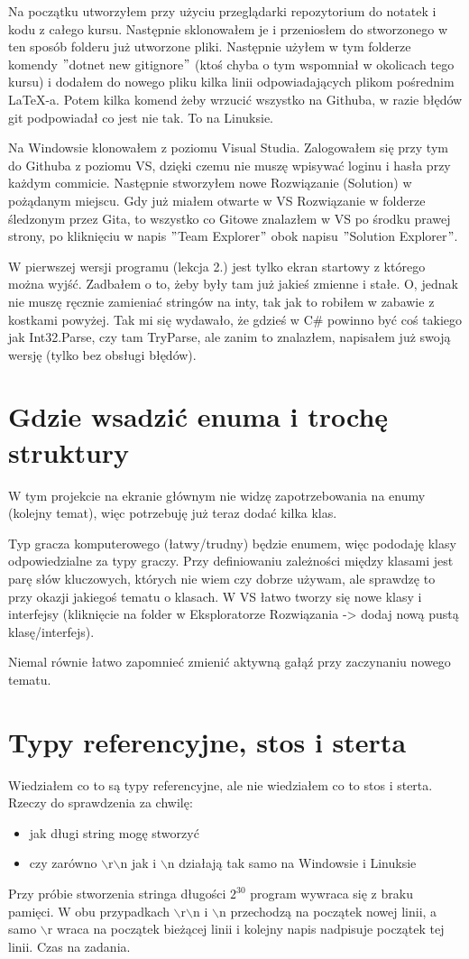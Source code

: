 \documentclass[10pt]{article}
\begin{document}
Na początku utworzyłem przy użyciu przeglądarki repozytorium do notatek i kodu z całego kursu. Następnie sklonowałem je i przeniosłem do stworzonego w ten sposób folderu już utworzone pliki. Następnie użyłem w tym folderze komendy $"$dotnet new gitignore$"$ (ktoś chyba o tym wspomniał w okolicach tego kursu) i dodałem do nowego pliku kilka linii odpowiadających plikom pośrednim LaTeX-a. Potem kilka komend żeby wrzucić wszystko na Githuba, w razie błędów git podpowiadał co jest nie tak. To na Linuksie.

Na Windowsie klonowałem z poziomu Visual Studia. Zalogowałem się przy tym do Githuba z poziomu VS, dzięki czemu nie muszę wpisywać loginu i hasła przy każdym commicie. Następnie stworzyłem nowe Rozwiązanie (Solution) w pożądanym miejscu. Gdy już miałem otwarte w VS Rozwiązanie w folderze śledzonym przez Gita, to wszystko co Gitowe znalazłem w VS po środku prawej strony, po kliknięciu w napis $"$Team Explorer$"$ obok napisu $"$Solution Explorer$"$.

W pierwszej wersji programu (lekcja 2.) jest tylko ekran startowy z którego można wyjść. Zadbałem o to, żeby były tam już jakieś zmienne i stałe. O, jednak nie muszę ręcznie zamieniać stringów na inty, tak jak to robiłem w zabawie z kostkami powyżej. Tak mi się wydawało, że gdzieś w C\# powinno być coś takiego jak Int32.Parse, czy tam TryParse, ale zanim to znalazłem, napisałem już swoją wersję (tylko bez obsługi błędów).

\section{Gdzie wsadzić enuma i trochę struktury}
W tym projekcie na ekranie głównym nie widzę zapotrzebowania na enumy (kolejny temat), więc potrzebuję już teraz dodać kilka klas.

Typ gracza komputerowego (łatwy/trudny) będzie enumem, więc pododaję klasy odpowiedzialne za typy graczy. Przy definiowaniu zależności między klasami jest parę słów kluczowych, których nie wiem czy dobrze używam, ale sprawdzę to przy okazji jakiegoś tematu o klasach. W VS łatwo tworzy się nowe klasy i interfejsy (kliknięcie na folder w Eksploratorze Rozwiązania -> dodaj nową pustą klasę/interfejs).

Niemal równie łatwo zapomnieć zmienić aktywną gałąź przy zaczynaniu nowego tematu.
\section{Typy referencyjne, stos i sterta}
Wiedziałem co to są typy referencyjne, ale nie wiedziałem co to stos i sterta. Rzeczy do sprawdzenia za chwilę:
\begin{itemize}
\item jak długi string mogę stworzyć
\item czy zarówno $\backslash$r$\backslash$n jak i $\backslash$n działają tak samo na Windowsie i Linuksie
\end{itemize}

Przy próbie stworzenia stringa długości $2^{30}$ program wywraca się z braku pamięci. W obu przypadkach $\backslash$r$\backslash$n i $\backslash$n przechodzą na początek nowej linii, a samo $\backslash$r wraca na początek bieżącej linii i kolejny napis nadpisuje początek tej linii. Czas na zadania.
\end{document}
